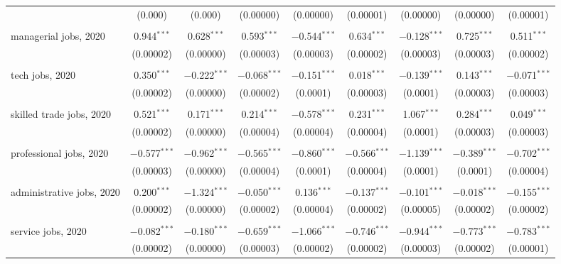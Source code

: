 \documentclass[]{interact}
\theoremstyle{plain}%
\theoremstyle{definition}
\theoremstyle{remark}
\begin{document}
\begin{table}
\begin{tabular}{@{\extracolsep{5pt}}lcccccccc}
  & (0.000) & (0.000) & (0.00000) & (0.00000) & (0.00001) & (0.00000) & (0.00000) & (0.00001) \\ 
  & & & & & & & & \\ 
 managerial jobs, 2020 & 0.944$^{***}$ & 0.628$^{***}$ & 0.593$^{***}$ & $-$0.544$^{***}$ & 0.634$^{***}$ & $-$0.128$^{***}$ & 0.725$^{***}$ & 0.511$^{***}$ \\ 
  & (0.00002) & (0.00000) & (0.00003) & (0.00003) & (0.00002) & (0.00003) & (0.00003) & (0.00002) \\ 
  & & & & & & & & \\ 
 tech jobs, 2020 & 0.350$^{***}$ & $-$0.222$^{***}$ & $-$0.068$^{***}$ & $-$0.151$^{***}$ & 0.018$^{***}$ & $-$0.139$^{***}$ & 0.143$^{***}$ & $-$0.071$^{***}$ \\ 
  & (0.00002) & (0.00000) & (0.00002) & (0.0001) & (0.00003) & (0.0001) & (0.00003) & (0.00003) \\ 
  & & & & & & & & \\ 
 skilled trade jobs, 2020 & 0.521$^{***}$ & 0.171$^{***}$ & 0.214$^{***}$ & $-$0.578$^{***}$ & 0.231$^{***}$ & 1.067$^{***}$ & 0.284$^{***}$ & 0.049$^{***}$ \\ 
  & (0.00002) & (0.00000) & (0.00004) & (0.00004) & (0.00004) & (0.0001) & (0.00003) & (0.00003) \\ 
  & & & & & & & & \\ 
 professional jobs, 2020 & $-$0.577$^{***}$ & $-$0.962$^{***}$ & $-$0.565$^{***}$ & $-$0.860$^{***}$ & $-$0.566$^{***}$ & $-$1.139$^{***}$ & $-$0.389$^{***}$ & $-$0.702$^{***}$ \\ 
  & (0.00003) & (0.00000) & (0.00004) & (0.0001) & (0.00004) & (0.0001) & (0.0001) & (0.00004) \\ 
  & & & & & & & & \\ 
 administrative jobs, 2020 & 0.200$^{***}$ & $-$1.324$^{***}$ & $-$0.050$^{***}$ & 0.136$^{***}$ & $-$0.137$^{***}$ & $-$0.101$^{***}$ & $-$0.018$^{***}$ & $-$0.155$^{***}$ \\ 
  & (0.00002) & (0.00000) & (0.00002) & (0.00004) & (0.00002) & (0.00005) & (0.00002) & (0.00002) \\ 
  & & & & & & & & \\ 
 service jobs, 2020 & $-$0.082$^{***}$ & $-$0.180$^{***}$ & $-$0.659$^{***}$ & $-$1.066$^{***}$ & $-$0.746$^{***}$ & $-$0.944$^{***}$ & $-$0.773$^{***}$ & $-$0.783$^{***}$ \\ 
  & (0.00002) & (0.00000) & (0.00003) & (0.00002) & (0.00002) & (0.00003) & (0.00002) & (0.00001) \\ 

\end{tabular}
\end{table}
\end{document}
